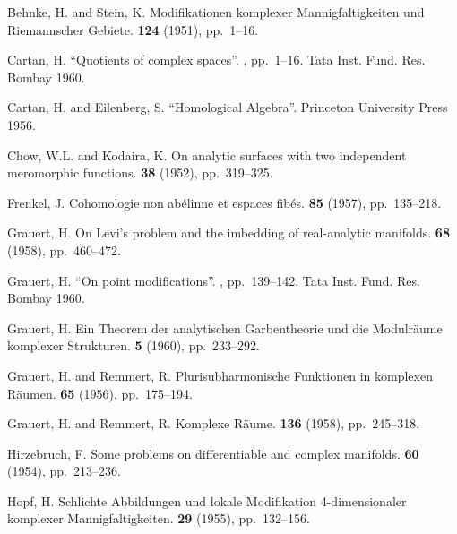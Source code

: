 \documentclass{article}
\theoremstyle{plain}
\theoremstyle{definition}
\begin{document}
\begin{thebibliography}{20}

  {\sc Behnke, H. and Stein, K.}
  \newblock Modifikationen komplexer Mannigfaltigkeiten und Riemannscher Gebiete.
   {\bf 124} (1951), pp.~1--16.

  {\sc Cartan, H.}
  \newblock ``Quotients of complex spaces''.
  , pp.~1--16.
  \newblock Tata Inst. Fund. Res. Bombay 1960.

  {\sc Cartan, H. and Eilenberg, S.}
  \newblock ``Homological Algebra''.
  \newblock Princeton University Press 1956.

  {\sc Chow, W.L. and Kodaira, K.}
  \newblock On analytic surfaces with two independent meromorphic functions.
   {\bf 38} (1952), pp.~319--325.

  {\sc Frenkel, J.}
  \newblock Cohomologie non ab\'{e}linne et espaces fib\'{e}s.
   {\bf 85} (1957), pp.~135--218.

  {\sc Grauert, H.}
  \newblock On Levi's problem and the imbedding of real-analytic manifolds.
   {\bf 68} (1958), pp.~460--472.

  {\sc Grauert, H.}
  \newblock ``On point modifications''.
  , pp.~139--142.
  \newblock Tata Inst. Fund. Res. Bombay 1960.

  {\sc Grauert, H.}
  \newblock Ein Theorem der analytischen Garbentheorie und die Modulr\"{a}ume komplexer Strukturen.
   {\bf 5} (1960), pp.~233--292.

  {\sc Grauert, H. and Remmert, R.}
  \newblock Plurisubharmonische Funktionen in komplexen R\"{a}umen.
   {\bf 65} (1956), pp.~175--194.

  {\sc Grauert, H. and Remmert, R.}
  \newblock Komplexe R\"{a}ume.
   {\bf 136} (1958), pp.~245--318.

  {\sc Hirzebruch, F.}
  \newblock Some problems on differentiable and complex manifolds.
   {\bf 60} (1954), pp.~213--236.

  {\sc Hopf, H.}
  \newblock Schlichte Abbildungen und lokale Modifikation 4-dimensionaler komplexer Mannigfaltigkeiten.
   {\bf 29} (1955), pp.~132--156.


\end{thebibliography}
\end{document}
